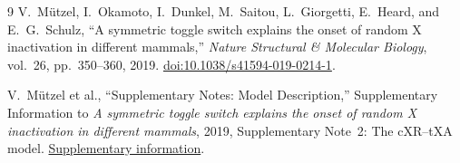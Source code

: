 \documentclass[11pt,a4paper]{article}
\begin{document}
\begin{thebibliography}{9}
V.~M\"utzel, I.~Okamoto, I.~Dunkel, M.~Saitou, L.~Giorgetti, E.~Heard,
and E.~G.~Schulz,
``A symmetric toggle switch explains the onset of random X inactivation in
different mammals,'' \emph{Nature Structural \& Molecular Biology},
vol.~26, pp.~350--360, 2019.
\href{https://doi.org/10.1038/s41594-019-0214-1}
{doi:10.1038/s41594-019-0214-1}.

V.~M\"utzel et al., ``Supplementary Notes: Model Description,'' Supplementary
Information to \emph{A symmetric toggle switch explains the onset of random
X inactivation in different mammals}, 2019, Supplementary Note~2: The
cXR--tXA model.
\href{https://pure.mpg.de/rest/items/item_3158407_1/component/file_3158409/content}
{Supplementary information}.
\end{thebibliography}
\end{document}
